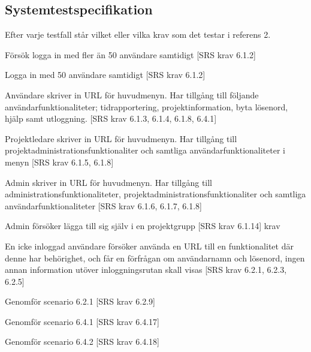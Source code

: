\documentclass[a4paper]{article}
\begin{document}
\begin{appendices}

\section{Systemtestspecifikation}

Efter varje testfall står vilket eller vilka krav som det testar i referens 2.

\begin{ST}


\item
Försök logga in med fler än 50 användare samtidigt [SRS krav 6.1.2]

\item
Logga in med 50 användare samtidigt [SRS krav 6.1.2]

\item 
Användare skriver in URL för huvudmenyn. Har tillgång till följande användarfunktionaliteter; tidrapportering, projektinformation, byta lösenord, hjälp samt utloggning. [SRS krav 6.1.3, 6.1.4, 6.1.8, 6.4.1]


\item 
Projektledare skriver in URL för huvudmenyn. Har tillgång till projektadministrationsfunktionaliter och samtliga användarfunktionaliteter i menyn [SRS krav 6.1.5, 6.1.8]

\item 
Admin skriver in URL för huvudmenyn. Har tillgång till administrationsfunktionaliteter, projektadministrationsfunktionaliter och samtliga användarfunktionaliteter [SRS krav 6.1.6, 6.1.7, 6.1.8]

\item
Admin försöker lägga till sig själv i en projektgrupp [SRS krav 6.1.14]
krav

\item
En icke inloggad användare försöker använda en URL till en funktionalitet där denne har behörighet, och får en förfrågan om användarnamn och lösenord, ingen annan information utöver inloggningsrutan skall visas [SRS krav 6.2.1, 6.2.3, 6.2.5]

\item
Genomför scenario 6.2.1 [SRS krav 6.2.9]

\item
Genomför scenario 6.4.1 [SRS krav 6.4.17]

\item
Genomför scenario 6.4.2 [SRS krav 6.4.18]


\end{ST}
\end{appendices}
\end{document}
